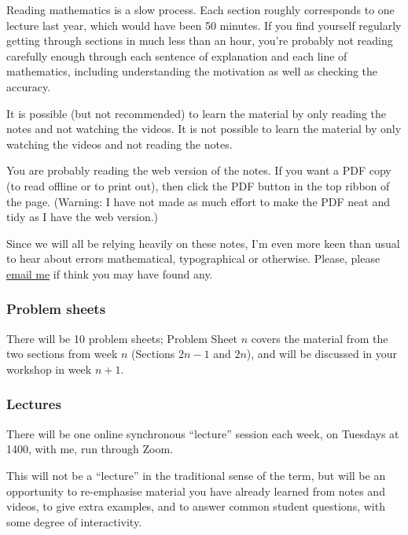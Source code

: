 \documentclass[
  a4paper,
]{article}
\theoremstyle{definition}
\theoremstyle{definition}
\theoremstyle{definition}
\theoremstyle{remark}
\begin{document}
Reading mathematics is a slow process. Each section roughly corresponds to one lecture last year, which would have been 50 minutes. If you find yourself regularly getting through sections in much less than an hour, you're probably not reading carefully enough through each sentence of explanation and each line of mathematics, including understanding the motivation as well as checking the accuracy.

It is possible (but not recommended) to learn the material by only reading the notes and not watching the videos. It is not possible to learn the material by only watching the videos and not reading the notes.

You are probably reading the web version of the notes. If you want a PDF copy (to read offline or to print out), then click the PDF button in the top ribbon of the page. (Warning: I have not made as much effort to make the PDF neat and tidy as I have the web version.)

Since we will all be relying heavily on these notes, I'm even more keen than usual to hear about errors mathematical, typographical or otherwise. Please, please \href{mailto:m.aldridge@leeds.ac.uk}{email me} if think you may have found any.

\hypertarget{problem-sheets}{%
\subsubsection*{Problem sheets}\label{problem-sheets}}

There will be 10 problem sheets; Problem Sheet \(n\) covers the material from the two sections from week \(n\) (Sections \(2n -1\) and \(2n\)), and will be discussed in your workshop in week \(n+1\).

\hypertarget{lectures}{%
\subsubsection*{Lectures}\label{lectures}}

There will be one online synchronous ``lecture'' session each week, on Tuesdays at 1400, with me, run through Zoom.

This will not be a ``lecture'' in the traditional sense of the term, but will be an opportunity to re-emphasise material you have already learned from notes and videos, to give extra examples, and to answer common student questions, with some degree of interactivity.
\end{document}
